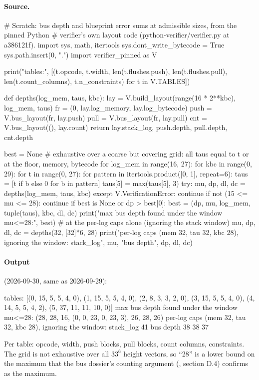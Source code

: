 \paragraph{Source.}
\begin{srccode}
# Scratch: bus depth and blueprint error sums at admissible sizes, from the pinned Python
# verifier's own layout code (python-verifier/verifier.py at a386121f).
import sys, math, itertools
sys.dont_write_bytecode = True
sys.path.insert(0, ".")
import verifier_pinned as V

print("tables:", [(t.opcode, t.width, len(t.flushes.push), len(t.flushes.pull), len(t.count_columns), t.n_constraints) for t in V.TABLES])

def depths(log_mem, taus, kbc):
    lay = V.build_layout(range(16 * 2**kbc), log_mem, taus)
    fr = (0, lay.log_memory, lay.log_bytecode)
    push = V.bus_layout(fr, lay.push)
    pull = V.bus_layout(fr, lay.pull)
    cnt = V.bus_layout((), lay.count)
    return lay.stack_log, push.depth, pull.depth, cnt.depth

best = None
# exhaustive over a coarse but covering grid: all taus equal to t or at the floor, memory, bytecode
for log_mem in range(16, 27):
    for kbc in range(0, 29):
        for t in range(0, 27):
            for pattern in itertools.product([0, 1], repeat=6):
                taus = [t if b else 0 for b in pattern]
                taus[5] = max(taus[5], 3)
                try:
                    mu, dp, dl, dc = depths(log_mem, taus, kbc)
                except V.VerificationError:
                    continue
                if not (15 <= mu <= 28):
                    continue
                if best is None or dp > best[0]:
                    best = (dp, mu, log_mem, tuple(taus), kbc, dl, dc)
print("max bus depth found under the window mu<=28:", best)
# at the per-log caps alone (ignoring the stack window)
mu, dp, dl, dc = depths(32, [32]*6, 28)
print("per-log caps (mem 32, tau 32, kbc 28), ignoring the window: stack_log", mu, "bus depth", dp, dl, dc)
\end{srccode}

\paragraph{Output} (2026-09-30, same as 2026-09-29):
\begin{shellcode}
tables: [(0, 15, 5, 5, 4, 0), (1, 15, 5, 5, 4, 0), (2, 8, 3, 3, 2, 0), (3, 15, 5, 5, 4, 0), (4, 14, 5, 5, 4, 2), (5, 37, 11, 11, 10, 0)]
max bus depth found under the window mu<=28: (28, 28, 16, (0, 0, 23, 0, 23, 3), 26, 28, 26)
per-log caps (mem 32, tau 32, kbc 28), ignoring the window: stack_log 41 bus depth 38 38 37
\end{shellcode}

Per table: opcode, width, push blocks, pull blocks, count columns, constraints. The grid is not
exhaustive over all $33^6$ height vectors, so ``28'' is a lower bound on the maximum that the bus
dossier's counting argument (, section D.4) confirms as the maximum.
